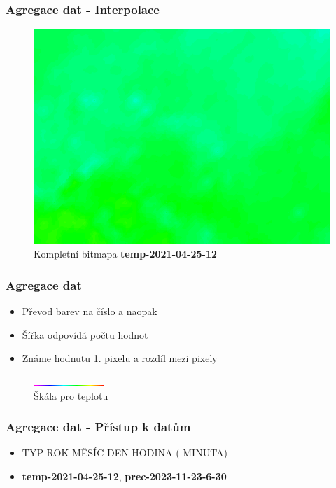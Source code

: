 \documentclass{beamer}
\begin{document}
	\begin{frame}
		\frametitle{Agregace dat - Interpolace}
		
		\begin{figure}
			
			\includegraphics[scale=0.5]{figures/bmp_vybarvena.png}
			\caption{Kompletní bitmapa \textbf{temp-2021-04-25-12}}
			
		\end{figure}
		
	\end{frame}

	\begin{frame}
		\frametitle{Agregace dat}
		
		\begin{itemize}
			\item Převod barev na číslo a naopak
			\item Šířka odpovídá počtu hodnot
			\item Známe hodnutu 1. pixelu a rozdíl mezi pixely
		\end{itemize}
		
		\begin{figure}
			
			\includegraphics[scale=3]{figures/scale_temp.png}
			\caption{Škála pro teplotu}
			
		\end{figure}
		
	\end{frame}

	\begin{frame}
		\frametitle{Agregace dat - Přístup k datům}
		
		\begin{itemize}
			\item TYP-ROK-MĚSÍC-DEN-HODINA (-MINUTA)
			\item \textbf{temp-2021-04-25-12}, \textbf{prec-2023-11-23-6-30}
		\end{itemize}
		
	\end{frame}
\end{document}
